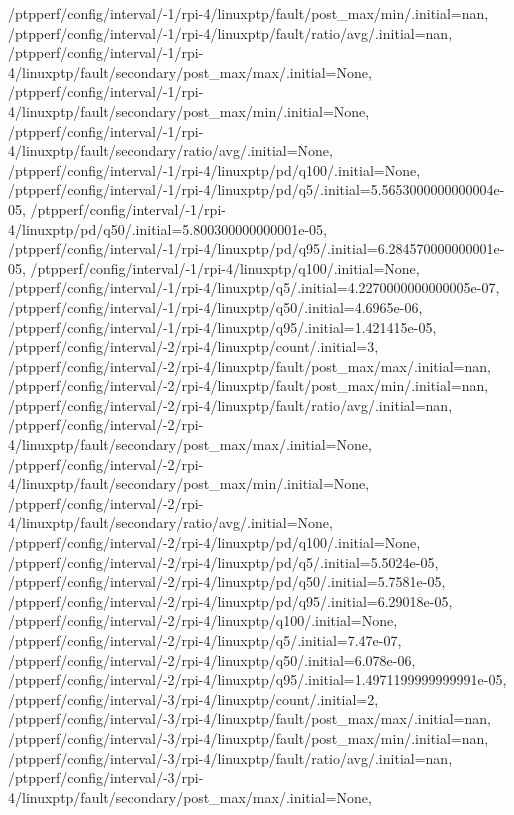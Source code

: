 {    /ptpperf/config/interval/-1/rpi-4/linuxptp/fault/post_max/min/.initial=nan,
    /ptpperf/config/interval/-1/rpi-4/linuxptp/fault/ratio/avg/.initial=nan,
    /ptpperf/config/interval/-1/rpi-4/linuxptp/fault/secondary/post_max/max/.initial=None,
    /ptpperf/config/interval/-1/rpi-4/linuxptp/fault/secondary/post_max/min/.initial=None,
    /ptpperf/config/interval/-1/rpi-4/linuxptp/fault/secondary/ratio/avg/.initial=None,
    /ptpperf/config/interval/-1/rpi-4/linuxptp/pd/q100/.initial=None,
    /ptpperf/config/interval/-1/rpi-4/linuxptp/pd/q5/.initial=5.5653000000000004e-05,
    /ptpperf/config/interval/-1/rpi-4/linuxptp/pd/q50/.initial=5.800300000000001e-05,
    /ptpperf/config/interval/-1/rpi-4/linuxptp/pd/q95/.initial=6.284570000000001e-05,
    /ptpperf/config/interval/-1/rpi-4/linuxptp/q100/.initial=None,
    /ptpperf/config/interval/-1/rpi-4/linuxptp/q5/.initial=4.2270000000000005e-07,
    /ptpperf/config/interval/-1/rpi-4/linuxptp/q50/.initial=4.6965e-06,
    /ptpperf/config/interval/-1/rpi-4/linuxptp/q95/.initial=1.421415e-05,
    /ptpperf/config/interval/-2/rpi-4/linuxptp/count/.initial=3,
    /ptpperf/config/interval/-2/rpi-4/linuxptp/fault/post_max/max/.initial=nan,
    /ptpperf/config/interval/-2/rpi-4/linuxptp/fault/post_max/min/.initial=nan,
    /ptpperf/config/interval/-2/rpi-4/linuxptp/fault/ratio/avg/.initial=nan,
    /ptpperf/config/interval/-2/rpi-4/linuxptp/fault/secondary/post_max/max/.initial=None,
    /ptpperf/config/interval/-2/rpi-4/linuxptp/fault/secondary/post_max/min/.initial=None,
    /ptpperf/config/interval/-2/rpi-4/linuxptp/fault/secondary/ratio/avg/.initial=None,
    /ptpperf/config/interval/-2/rpi-4/linuxptp/pd/q100/.initial=None,
    /ptpperf/config/interval/-2/rpi-4/linuxptp/pd/q5/.initial=5.5024e-05,
    /ptpperf/config/interval/-2/rpi-4/linuxptp/pd/q50/.initial=5.7581e-05,
    /ptpperf/config/interval/-2/rpi-4/linuxptp/pd/q95/.initial=6.29018e-05,
    /ptpperf/config/interval/-2/rpi-4/linuxptp/q100/.initial=None,
    /ptpperf/config/interval/-2/rpi-4/linuxptp/q5/.initial=7.47e-07,
    /ptpperf/config/interval/-2/rpi-4/linuxptp/q50/.initial=6.078e-06,
    /ptpperf/config/interval/-2/rpi-4/linuxptp/q95/.initial=1.4971199999999991e-05,
    /ptpperf/config/interval/-3/rpi-4/linuxptp/count/.initial=2,
    /ptpperf/config/interval/-3/rpi-4/linuxptp/fault/post_max/max/.initial=nan,
    /ptpperf/config/interval/-3/rpi-4/linuxptp/fault/post_max/min/.initial=nan,
    /ptpperf/config/interval/-3/rpi-4/linuxptp/fault/ratio/avg/.initial=nan,
    /ptpperf/config/interval/-3/rpi-4/linuxptp/fault/secondary/post_max/max/.initial=None,
}
